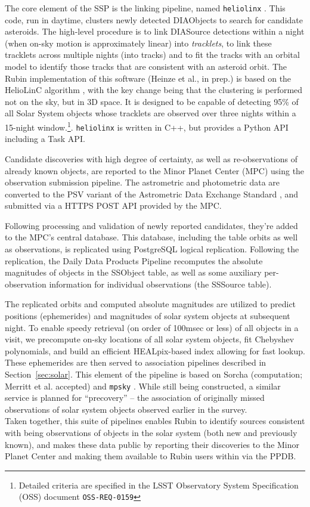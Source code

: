 The core element of the SSP is the linking pipeline, named {\tt heliolinx} \citep{heliolinx}.  This code, run in daytime, clusters newly detected DIAObjects to search for candidate asteroids.  The high-level procedure is to link DIASource detections within a night (when on-sky motion is approximately linear) into {\em tracklets}, to link these tracklets across multiple nights (into tracks) and to fit the tracks with an orbital model to identify those tracks that are consistent with an asteroid orbit.  The Rubin implementation of this software (Heinze et al., in prep.) is based on the HelioLinC algorithm \citep{2018AJ....156..135H}, with the key change being that the clustering is performed not on the sky, but in 3D space.  It is designed to be capable of detecting 95\% of all Solar System objects whose tracklets are observed over three nights within a 15-night window.\footnote{Detailed criteria are specified in the LSST Observatory System Specification (OSS) document {\tt OSS-REQ-0159}}. {\tt heliolinx} is written in C++, but provides a Python API including a Task API.

Candidate discoveries with high degree of certainty, as well as re-observations of already known objects, are reported to the Minor Planet Center (MPC) using the observation submission pipeline.  The astrometric and photometric data are converted to the PSV variant of the Astrometric Data Exchange Standard \citep[ADES;][]{2017DPS....4911214C}, and submitted via a HTTPS POST API provided by the MPC.

Following processing and validation of newly reported candidates, they're added to the MPC's central database.  This database, including the table orbits as well as observations, is replicated using PostgreSQL logical replication.  Following the replication, the Daily Data Products Pipeline recomputes the absolute magnitudes of objects in the SSObject table, as well as some auxiliary per-observation information for individual observations (the SSSource table).

The replicated orbits and computed absolute magnitudes are utilized to predict positions (ephemerides) and magnitudes of solar system objects at subsequent night.  To enable speedy retrieval (on order of 100msec or less) of all objects in a visit, we precompute on-sky locations of all solar system objects, fit Chebyshev polynomials, and build an efficient HEALpix-based index allowing for fast lookup.  These ephemerides are then served to association pipelines described in Section~\ref{sec:solar}.  This element of the pipeline is based on Sorcha (computation; Merritt et al.  accepted) and {\tt mpsky} \citep[fast lookup and serving;][]{mpsky}.  While still being constructed, a similar service is planned for ``precovery'' -- the association of originally missed observations of solar system objects observed earlier in the survey.
\\

Taken together, this suite of pipelines enables Rubin to identify sources consistent with being observations of objects in the solar system (both new and previously known), and makes these data public by reporting their discoveries to the Minor Planet Center and making them available to Rubin users within via the PPDB.
